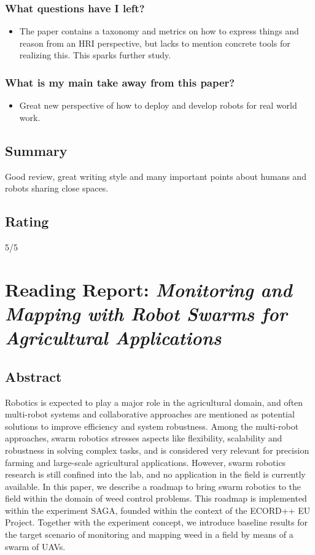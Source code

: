     \subsubsection*{What questions have I left?}
    \begin{itemize}
        \item The paper contains a taxonomy and metrics on how to express things and reason from an HRI perspective, but lacks to mention concrete tools for realizing this. This sparks further study.
    \end{itemize}
    \subsubsection*{What is my main take away from this paper?}
    \begin{itemize}
        \item Great new perspective of how to deploy and develop robots for real world work.
    \end{itemize}
    
    \subsection*{Summary}
    Good review, great writing style and many important points about humans and robots sharing close spaces. 
    
    \subsection*{Rating}
    5/5
    
    
    \newpage
    \section{Reading Report: \emph{Monitoring and Mapping with Robot Swarms for Agricultural Applications}}
    \cite{Albani2017}
    
    \subsection*{Abstract}
    Robotics is expected to play a major role in the agricultural domain, and often multi-robot systems and collaborative approaches are mentioned as potential solutions
    to improve efficiency and system robustness. Among the
    multi-robot approaches, swarm robotics stresses aspects
    like flexibility, scalability and robustness in solving complex
    tasks, and is considered very relevant for precision farming
    and large-scale agricultural applications. However, swarm
    robotics research is still confined into the lab, and no application in the field is currently available. In this paper,
    we describe a roadmap to bring swarm robotics to the field
    within the domain of weed control problems. This roadmap
    is implemented within the experiment SAGA, founded within
    the context of the ECORD++ EU Project. Together with the
    experiment concept, we introduce baseline results for the
    target scenario of monitoring and mapping weed in a field
    by means of a swarm of UAVs.
    
